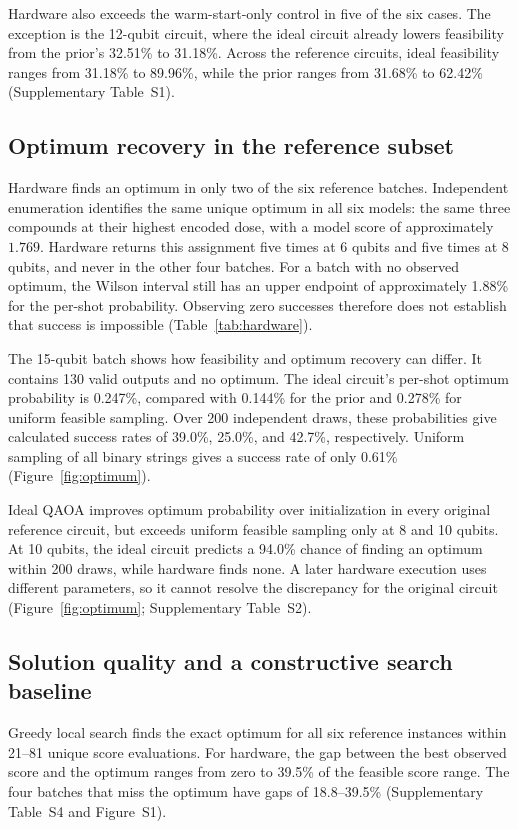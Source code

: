 \documentclass[utf8]{FrontiersinHarvard}
\begin{document}
Hardware also exceeds the warm-start-only control in five of the six cases. The exception is the 12-qubit circuit, where the ideal circuit already lowers feasibility from the prior's 32.51\% to 31.18\%. Across the reference circuits, ideal feasibility ranges from 31.18\% to 89.96\%, while the prior ranges from 31.68\% to 62.42\% (Supplementary Table~S1).

\subsection{Optimum recovery in the reference subset}
Hardware finds an optimum in only two of the six reference batches. Independent enumeration identifies the same unique optimum in all six models: the same three compounds at their highest encoded dose, with a model score of approximately $1.769$. Hardware returns this assignment five times at 6 qubits and five times at 8 qubits, and never in the other four batches. For a batch with no observed optimum, the Wilson interval still has an upper endpoint of approximately 1.88\% for the per-shot probability. Observing zero successes therefore does not establish that success is impossible (Table~\ref{tab:hardware}).

The 15-qubit batch shows how feasibility and optimum recovery can differ. It contains 130 valid outputs and no optimum. The ideal circuit's per-shot optimum probability is 0.247\%, compared with 0.144\% for the prior and 0.278\% for uniform feasible sampling. Over 200 independent draws, these probabilities give calculated success rates of 39.0\%, 25.0\%, and 42.7\%, respectively. Uniform sampling of all binary strings gives a success rate of only 0.61\% (Figure~\ref{fig:optimum}).

Ideal QAOA improves optimum probability over initialization in every original reference circuit, but exceeds uniform feasible sampling only at 8 and 10 qubits. At 10 qubits, the ideal circuit predicts a 94.0\% chance of finding an optimum within 200 draws, while hardware finds none. A later hardware execution uses different parameters, so it cannot resolve the discrepancy for the original circuit (Figure~\ref{fig:optimum}; Supplementary Table~S2).

\subsection{Solution quality and a constructive search baseline}
Greedy local search finds the exact optimum for all six reference instances within 21--81 unique score evaluations. For hardware, the gap between the best observed score and the optimum ranges from zero to 39.5\% of the feasible score range. The four batches that miss the optimum have gaps of 18.8--39.5\% (Supplementary Table~S4 and Figure~S1).
\end{document}
